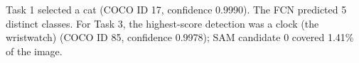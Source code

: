 Task 1 selected a cat (COCO ID 17, confidence 0.9990). The FCN predicted 5 distinct classes. For Task 3, the highest-score detection was a clock (the wristwatch) (COCO ID 85, confidence 0.9978); SAM candidate 0 covered 1.41\% of the image.

